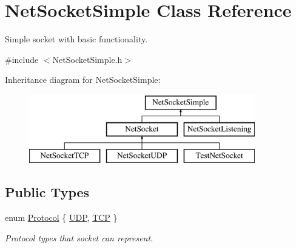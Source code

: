 \hypertarget{class_net_socket_simple}{
\section{NetSocketSimple Class Reference}
\label{class_net_socket_simple}
}


Simple socket with basic functionality.  




{\ttfamily \#include $<$NetSocketSimple.h$>$}

Inheritance diagram for NetSocketSimple:\begin{figure}[H]
\begin{center}
\leavevmode
\includegraphics[height=3.000000cm]{class_net_socket_simple}
\end{center}
\end{figure}
\subsection*{Public Types}
\begin{DoxyCompactItemize}
\item 
enum \hyperlink{class_net_socket_simple_a31450636f6fb9ece239c50f616e0d7b0}{Protocol} \{ \hyperlink{class_net_socket_simple_a31450636f6fb9ece239c50f616e0d7b0a01b7e644d632a43bbec04dbd373a1b34}{UDP}, 
\hyperlink{class_net_socket_simple_a31450636f6fb9ece239c50f616e0d7b0ad093d601c519b54e673755f915cd6467}{TCP}
 \}
\begin{DoxyCompactList}\small\item\em Protocol types that socket can represent. \item\end{DoxyCompactList}\end{DoxyCompactItemize}
